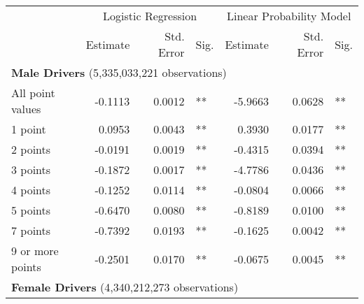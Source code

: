 
\begin{table}%
\centering 
\begin{tabular}{l r r l r r l} 

\hline 
 
 & \multicolumn{3}{c}{Logistic Regression}  & \multicolumn{3}{c}{Linear Probability Model} \\ 

 \cmidrule(lr){2-4}\cmidrule(lr){5-7} 
 & Estimate & Std. Error & Sig. & Estimate & Std. Error & Sig. \\ 

\hline 
 
\multicolumn{7}{l}{\textbf{Male Drivers} (5,335,033,221 observations)} \\ 

All point values                &  -0.1113        &  0.0012       &   **       &  -5.9663        &  0.0628       &   **       \\ 
1 point                         &  0.0953        &  0.0043       &   **       &  0.3930        &  0.0177       &   **       \\ 
2 points                        &  -0.0191        &  0.0019       &   **       &  -0.4315        &  0.0394       &   **       \\ 
3 points                        &  -0.1872        &  0.0017       &   **       &  -4.7786        &  0.0436       &   **       \\ 
4 points                        &  -0.1252        &  0.0114       &   **       &  -0.0804        &  0.0066       &   **       \\ 
5 points                        &  -0.6470        &  0.0080       &   **       &  -0.8189        &  0.0100       &   **       \\ 
7 points                        &  -0.7392        &  0.0193       &   **       &  -0.1625        &  0.0042       &   **       \\ 
9 or more points                &  -0.2501        &  0.0170       &   **       &  -0.0675        &  0.0045       &   **       \\ 

\hline 

\multicolumn{7}{l}{\textbf{Female Drivers} (4,340,212,273 observations)} \\ 


\end{tabular}
\end{table}
